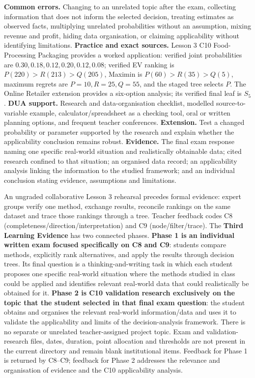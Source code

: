 \documentclass[10pt,letterpaper]{article}
\newcommand{\partheading}[1]{\Needspace{6\baselineskip}\par\vspace{5pt}{\bfseries #1\par}\vspace{1pt}}
\begin{document}
\begin{bluebox}
		\textbf{Common errors.} Changing to an unrelated topic after the exam,
		collecting information that does not inform the selected decision, treating
		estimates as observed facts, multiplying unrelated probabilities without an
		assumption, mixing revenue and profit, hiding data organisation, or claiming
		applicability without identifying limitations. \textbf{Practice and exact
		sources.} Lesson 3 C10 Food-Processing Packaging provides a worked application:
		verified joint probabilities are $0.30,0.18,0.12,0.20,0.12,0.08$; verified EV
		ranking is $P(220)>R(213)>Q(205)$, Maximin is $P(60)>R(35)>Q(5)$, maximum
		regrets are $P=10,R=25,Q=55$, and the staged tree selects $P$. The Online
		Retailer extension provides a six-option analysis; its verified final leaf is
		$S_5$. \textbf{DUA support.} Research and data-organisation checklist, modelled
		source-to-variable example, calculator/spreadsheet as a checking tool, oral or
		written planning options, and frequent teacher conferences. \textbf{Extension.}
		Test a changed probability or parameter supported by the research and explain
		whether the applicability conclusion remains robust. \textbf{Evidence.} The
		final exam response naming one specific real-world situation and realistically
		obtainable data; cited research confined to that situation; an organised data
		record; an applicability analysis linking the information to the studied
		framework; and an individual conclusion stating evidence, assumptions and
		limitations.
		
		\partheading{Practice and Assessment---Third Learning Evidence}
		An ungraded collaborative Lesson 3 rehearsal precedes formal evidence: expert
		groups verify one method, exchange results, reconcile rankings on the same
		dataset and trace those rankings through a tree. Teacher feedback codes C8
		(completeness/direction/interpretation) and C9 (node/filter/trace).
		The \textbf{Third Learning Evidence} has two connected phases.
		\textbf{Phase 1 is an individual written exam focused specifically on C8 and
		C9}: students compare methods, explicitly rank alternatives, and apply the
		results through decision trees. Its final question is a thinking-and-writing
		task in which each student proposes one specific real-world situation where
		the methods studied in class could be applied and identifies relevant
		real-world data that could realistically be obtained for it. \textbf{Phase 2
		is C10 validation research exclusively on the topic that the student selected
		in that final exam question}: the student obtains and organises the relevant
		real-world information/data and uses it to validate the applicability and
		limits of the decision-analysis framework. There is no separate or unrelated
		teacher-assigned project topic. Exam and validation-research files, dates,
		duration, point allocation and thresholds are not present in the current
		directory and remain blank institutional items. Feedback for Phase 1 is
		returned by C8--C9; feedback for Phase 2 addresses the relevance and
		organisation of evidence and the C10 applicability analysis.
		

\end{bluebox}
\end{document}
